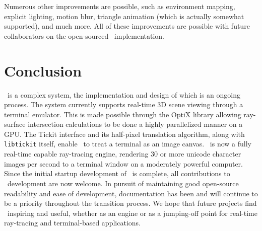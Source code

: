Numerous other improvements are possible, such as environment mapping, explicit lighting, motion blur, triangle animation (which is actually somewhat supported), and much more.
All of these improvements are possible with future collaborators on the open-sourced \name\ implementation.

\section{Conclusion}\label{ch:conclusion:end}

\name\ is a complex system, the implementation and design of which is an ongoing process.
The system currently supports real-time 3D scene viewing through a terminal emulator.
This is made possible through the OptiX library allowing ray-surface intersection calculations to be done a highly parallelized manner on a GPU.
The Tickit interface and its half-pixel translation algorithm, along with \texttt{libtickit} itself, enable \name\ to treat a terminal as an image canvas.
\name\ is now a fully real-time capable ray-tracing engine, rendering 30 or more unicode character images per second to a terminal window on a moderately powerful computer.
Since the initial startup development of \name\ is complete, all contributions to \name\ development are now welcome.
In pursuit of maintaining good open-source readability and ease of development, documentation has been and will continue to be a priority throughout the transition process.
We hope that future projects find \name\ inspiring and useful, whether as an engine or as a jumping-off point for real-time ray-tracing and terminal-based applications.
